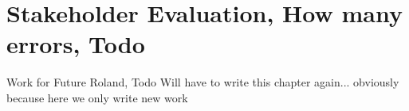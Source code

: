 \section{Stakeholder Evaluation, How many errors, Todo}


Work for Future Roland, Todo
Will have to write this chapter again... obviously because here we only write new work